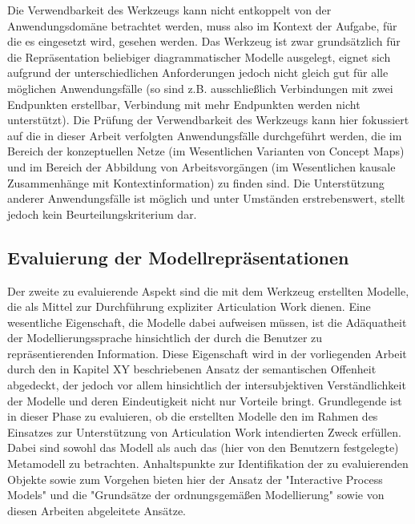 Die Verwendbarkeit des Werkzeugs kann nicht entkoppelt von der Anwendungsdomäne betrachtet werden, muss also im Kontext der Aufgabe, für die es eingesetzt wird, gesehen werden. Das Werkzeug ist zwar grundsätzlich für die Repräsentation beliebiger diagrammatischer Modelle ausgelegt, eignet sich aufgrund der unterschiedlichen Anforderungen jedoch nicht gleich gut für alle möglichen Anwendungsfälle (so sind z.B. ausschließlich Verbindungen mit zwei Endpunkten erstellbar, Verbindung mit mehr Endpunkten werden nicht unterstützt). Die Prüfung der Verwendbarkeit des Werkzeugs kann hier fokussiert auf die in dieser Arbeit verfolgten Anwendungsfälle durchgeführt werden, die im Bereich der konzeptuellen Netze (im Wesentlichen Varianten von Concept Maps) und im Bereich der Abbildung von Arbeitsvorgängen (im Wesentlichen kausale Zusammenhänge mit Kontextinformation) zu finden sind. Die Unterstützung anderer Anwendungsfälle ist möglich und unter Umständen erstrebenswert, stellt jedoch kein Beurteilungskriterium dar.

\subsection{Evaluierung der Modellrepräsentationen}
\label{sub:eval_modell}

Der zweite zu evaluierende Aspekt sind die mit dem Werkzeug erstellten Modelle, die als Mittel zur Durchführung expliziter Articulation Work dienen. Eine wesentliche Eigenschaft, die Modelle dabei aufweisen müssen, ist die Adäquatheit der Modellierungssprache hinsichtlich der durch die Benutzer zu repräsentierenden Information. Diese Eigenschaft wird in der vorliegenden Arbeit durch den in Kapitel XY beschriebenen Ansatz der semantischen Offenheit abgedeckt, der jedoch vor allem hinsichtlich der intersubjektiven Verständlichkeit der Modelle und deren Eindeutigkeit nicht nur Vorteile bringt. Grundlegende ist in dieser Phase zu evaluieren, ob die erstellten Modelle den im Rahmen des Einsatzes zur Unterstützung von Articulation Work intendierten Zweck erfüllen. Dabei sind sowohl das Modell als auch das (hier von den Benutzern festgelegte) Metamodell zu betrachten. Anhaltspunkte zur Identifikation der zu evaluierenden Objekte sowie zum Vorgehen bieten hier der Ansatz der "Interactive Process Models" \citep{Jorgensen04} und die "Grundsätze der ordnungsgemäßen Modellierung" \citep{Becker00} sowie von diesen Arbeiten abgeleitete Ansätze.

